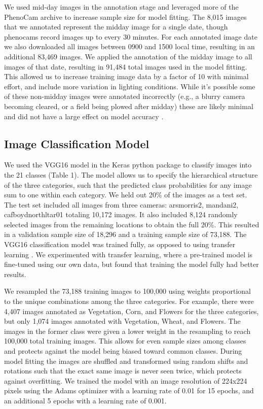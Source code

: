 \documentclass{article}
\begin{document}
We used mid-day images in the annotation stage and leveraged more of the PhenoCam archive to increase sample size for model fitting. The 8,015 images that we annotated represent the midday image for a single date, though phenocams record images up to every 30 minutes. For each annotated image date we also downloaded all images between 0900 and 1500 local time, resulting in an additional 83,469 images. We applied the annotation of the midday image to all images of that date, resulting in 91,484 total images used in the model fitting. This allowed us to increase training image data by a factor of 10 with minimal effort, and include more variation in lighting conditions. While it’s possible some of these non-midday images were annotated incorrectly (e.g., a blurry camera becoming cleared, or a field being plowed after midday) these are likely minimal and did not have a large effect on model accuracy \citep{norouzzadeh2018}. 

\subsection{Image Classification Model}

We used the VGG16 model in the Keras python package to classify images into the 21 classes (Table 1)\citep{simonyan2014-VGG16, chollet2018-keras}. The model allows us to specify the hierarchical structure of the three categories, such that the predicted class probabilities for any image sum to one within each category. We held out 20\% of the images as a test set. The test set included all images from three cameras: arsmorris2, mandani2, cafboydnorthltar01 totaling 10,172 images. It also included 8,124 randomly selected images from the remaining locations to obtain the full 20\%. This resulted in a validation sample size of 18,296 and a training sample size of 73,188. The VGG16 classification model was trained fully, as opposed to using transfer learning \citep{norouzzadeh2018}. We experimented with transfer learning, where a pre-trained model is fine-tuned using our own data, but found that training the model fully had better results. 

We resampled the 73,188 training images to 100,000 using weights proportional to the unique combinations among the three categories. For example, there were 4,407 images annotated as Vegetation, Corn, and Flowers for the three categories, but only 1,074 images annotated with Vegetation, Wheat, and Flowers. The images in the former class were given a lower weight in the resampling to reach 100,000 total training images. This allows for even sample sizes among classes and protects against the model being biased toward common classes. During model fitting the images are shuffled and transformed using random shifts and rotations such that the exact same image is never seen twice, which protects against overfitting. We trained the model with an image resolution of 224x224 pixels using the Adams optimizer with a learning rate of 0.01 for 15 epochs, and an additional 5 epochs with a learning rate of 0.001.
\end{document}
